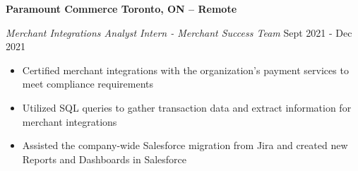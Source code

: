 \textbf{Paramount Commerce \hfill Toronto, ON -- Remote}\par
\textit{Merchant Integrations Analyst Intern - Merchant Success Team} \hfill Sept 2021 - Dec 2021

\begin{itemize}
	\item Certified merchant integrations with the organization's payment services to meet compliance requirements
	\item Utilized SQL queries to gather transaction data and extract information for merchant integrations
	\item Assisted the company-wide Salesforce migration from Jira and created new Reports and Dashboards in Salesforce
\end{itemize}
\vspace{0.1cm} \par
